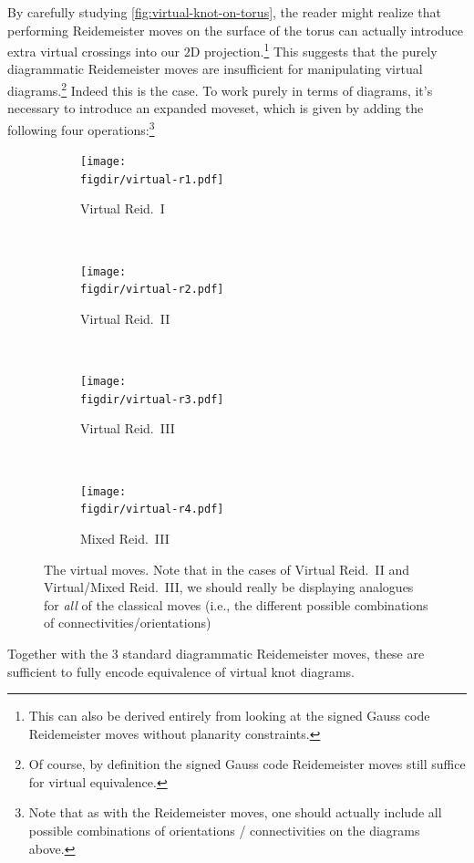 By carefully studying \cref{fig:virtual-knot-on-torus}, the reader
might realize that performing Reidemeister moves on the surface of the
torus can actually introduce extra virtual crossings into our $2$D
projection.\footnote{This can also be derived entirely from looking at
  the signed Gauss code Reidemeister moves without planarity
  constraints.} This suggests that the purely diagrammatic
Reidemeister moves are insufficient for manipulating virtual
diagrams.\footnote{Of course, by definition the signed Gauss code
  Reidemeister moves still suffice for virtual equivalence.} Indeed
this is the case. To work purely in terms of diagrams, it's necessary
to introduce an expanded moveset, which is given by adding the
following four operations:\footnote{Note that as with the Reidemeister
  moves, one should actually include all possible combinations of
  orientations / connectivities on the diagrams above.}
\begin{figure}[H]
  \centering
  \begin{subfigure}[t]{0.5\textwidth}
    \centering
    \texttt{[image: \\figdir/virtual-r1.pdf]}
    \caption{Virtual Reid.\ I}
    \label{fig:virtual-r1}
  \end{subfigure}%
  ~
  \begin{subfigure}[t]{0.5\textwidth}
    \centering
    \texttt{[image: \\figdir/virtual-r2.pdf]}
    \caption{Virtual Reid.\ II}
  \end{subfigure}\\[1.5em]
  \begin{subfigure}[t]{0.5\textwidth}
    \centering
    \texttt{[image: \\figdir/virtual-r3.pdf]}
    \caption{Virtual Reid.\ III}
    \label{fig:virtual-r1}
  \end{subfigure}%
  ~
  \begin{subfigure}[t]{0.5\textwidth}
    \centering
    \texttt{[image: \\figdir/virtual-r4.pdf]}
    \caption{Mixed Reid.\ III}
  \end{subfigure}
  \caption[The virtual moves]{The virtual moves. Note that in the
    cases of Virtual Reid.\ II and Virtual/Mixed Reid.\ III, we should
    really be displaying analogues for \emph{all} of the classical
    moves (i.e., the different possible combinations of
    connectivities/orientations)}
\end{figure}
Together with the 3 standard diagrammatic Reidemeister moves, these
are sufficient to fully encode equivalence of virtual knot diagrams.

